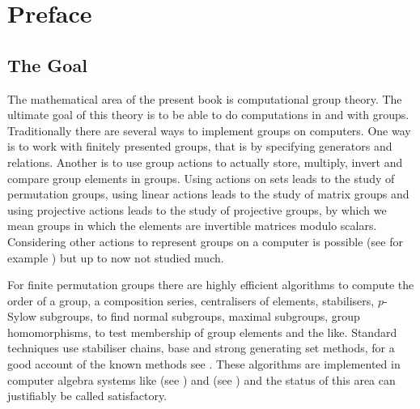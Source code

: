 
\chapter*{Preface}

\renewcommand{\thechapter}{0}


\section{The Goal}

The mathematical area of the present book is computational group
theory. The ultimate goal of this theory is to be able to do
computations in and with groups. Traditionally there are several ways
to implement groups on computers. One way is to work with finitely
presented groups, that is by specifying generators and relations.
Another is to use group actions to actually store,
multiply, invert and compare group elements in groups. Using 
actions on sets leads to the study of permutation groups, using linear
actions leads to the study of matrix groups and using projective
actions leads to the study of projective groups, by which we mean
groups in which the elements are invertible matrices modulo scalars.
Considering other actions to represent groups on a computer is
possible (see for example \cite{Kohl}) but up to now not studied much.

For finite permutation groups there are highly efficient
algorithms to compute the order of a group, a composition series,
centralisers of elements, stabilisers, $p$-Sylow subgroups, to find
normal subgroups, maximal subgroups, group homomorphisms, to test
membership of group elements and the like.
Standard techniques use stabiliser chains, base and strong generating
set methods, for a good account of the known methods see \cite{Ser}. 
These algorithms are implemented in computer algebra
systems like {\GAP} (see \cite{GAP4}) and {\MAGMA} (see \cite{Magma})
and the status of this area can justifiably be called satisfactory.

